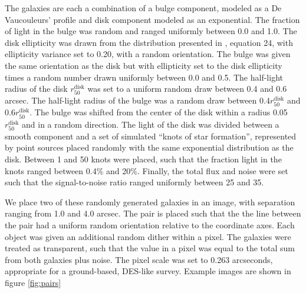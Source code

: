 \documentclass[fleqn,useAMS,usenatbib]{mnras}
\begin{document}
The galaxies are each a combination of a bulge component, modeled as a De
Vaucouleurs' profile \citep{devauc1948} and disk component modeled as an
exponential. The fraction of light in the bulge was random and ranged uniformly
between 0.0 and 1.0. The disk ellipticity was drawn from the distribution
presented in \cite{ba14}, equation 24, with ellipticity variance set to 0.20,
with a random orientation. The bulge was given the same orientation as the disk
but with ellipticity set to the disk ellipticity times a random number drawn
uniformly between 0.0 and 0.5. The half-light radius of the disk
$r_{50}^{\mathrm{disk}}$ was set to a uniform random draw between 0.4 and 0.6
arcsec. The half-light radius of the bulge was a random draw between $0.4
r_{50}^{\mathrm{disk}}$ and $0.6 r_{50}^{\mathrm{disk}}$. The bulge was shifted
from the center of the disk within a radius 0.05$r_{50}^{\mathrm{disk}}$ and in
a random direction. The light of the disk was divided between a smooth component
and a set of simulated ``knots of star formation'', represented by point sources
placed randomly with the same exponential distribution as the disk.  Between 1
and 50 knots were placed, such that the fraction light in the knots ranged
between 0.4\% and 20\%. Finally, the total flux and noise were set such that the
signal-to-noise ratio ranged uniformly between 25 and 35.

We place two of these randomly generated galaxies in an image, with separation
ranging from 1.0 and 4.0 arcsec. The pair is placed such that the the line
between the pair had a uniform random orientation relative to the coordinate
axes. Each object was given an additional random dither within a pixel. The
galaxies were treated as transparent, such that the value in a pixel was equal
to the total sum from both galaxies plus noise. The pixel scale was set to 0.263
arcseconds, appropriate for a ground-based, DES-like survey. Example images are
shown in figure \ref{fig:pairs}
\end{document}
